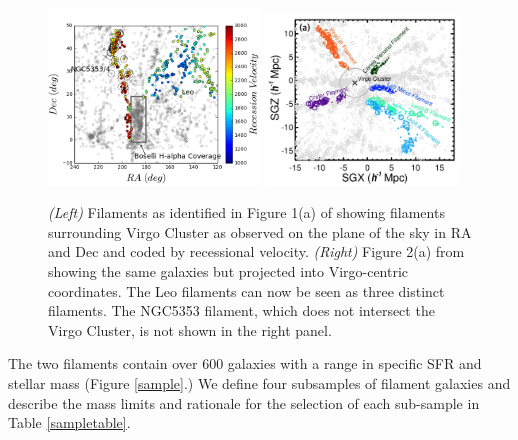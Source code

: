 \documentclass[11pt, preprint]{aastex}
\newcommand{\ha}{H$\alpha$}
\begin{document}
\begin{figure}[h]
\centering
\includegraphics[width=0.5\textwidth]{filaments.png}
\includegraphics[width=0.46\textwidth]{KimFig2a.png}
\caption{\small {\it (Left)} Filaments as identified in Figure 1(a) of \citet{kim16} showing filaments
  surrounding Virgo Cluster as observed on the plane of the sky in RA and Dec and coded by recessional velocity.  {\it (Right)} Figure 2(a) from \citet{kim16} showing the same galaxies but projected into
Virgo-centric coordinates.  The Leo filaments can now be seen as three
distinct filaments.  The NGC5353 filament, which does not intersect
the Virgo Cluster, is not shown in the right panel.}
\label{kimfigure}
\end{figure}



The two filaments contain over 600 galaxies with a range in specific SFR and stellar mass (Figure \ref{sample}.)
 We define four subsamples of filament galaxies and describe the mass limits and rationale for
the selection of each sub-sample in Table \ref{sampletable}.


\end{document}
